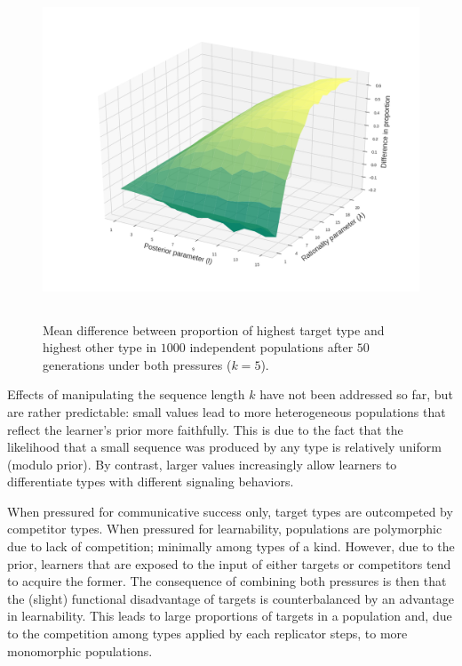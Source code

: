 \documentclass[a4paper, 11pt]{article}
\theoremstyle{Satz}
\begin{document}
\begin{figure}[t]
\centering
\includegraphics[width=1\textwidth,height=10cm,keepaspectratio]{./plots/fig4-3d-incumbents-difference} %
\caption{Mean difference between proportion of highest target type and highest other type in
  $1000$ independent populations after $50$ generations under both pressures ($k = 5$).}
\label{fig:diff}
\end{figure}

Effects of manipulating the sequence length $k$ have not been addressed so far, but are rather
predictable: small values lead to more heterogeneous populations that reflect the learner's
prior more faithfully. This is due to the fact that the likelihood that a small sequence was
produced by any type is relatively uniform (modulo prior). By contrast, larger values
increasingly allow learners to differentiate types with different signaling behaviors.

When pressured for communicative success only, target types are outcompeted by competitor types. When pressured for learnability, populations are polymorphic due to lack of competition; minimally among types of a kind. However, due to the prior, learners that are exposed to the input of either targets or competitors tend to acquire the former. The consequence of combining both pressures is then that the (slight) functional disadvantage of targets is counterbalanced by an advantage in learnability. This leads to large proportions of targets in a population and, due to the competition among types applied by each replicator steps, to more monomorphic populations. 
\end{document}
